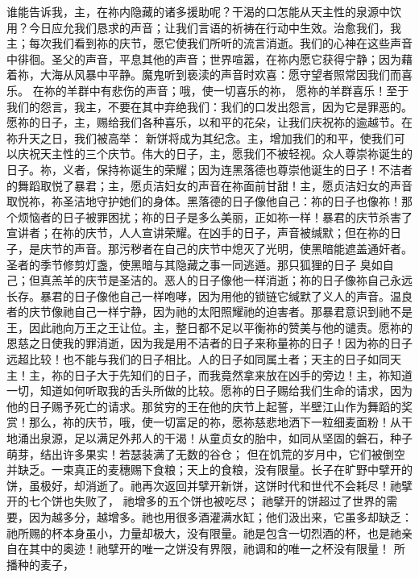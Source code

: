 谁能告诉我，主，在祢内隐藏的诸多援助呢？干渴的口怎能从天主性的泉源中饮用？\newline{}今日应允我们恳求的声音；让我们言语的祈祷在行动中生效。治愈我们，我主；每次我们看到祢的庆节，愿它使我们所听的流言消逝。我们的心神在这些声音中徘徊。圣父的声音，平息其他的声音；世界喧嚣，在祢内愿它获得宁静；因为藉着祢，大海从风暴中平静。\newline{}魔鬼听到亵渎的声音时欢喜：愿守望者照常因我们而喜乐。 在祢的羊群中有悲伤的声音；哦，使一切喜乐的祢， 愿祢的羊群喜乐！\newline{}至于我们的怨言，我主，不要在其中弃绝我们：我们的口发出怨言，因为它是罪恶的。愿祢的日子，主，赐给我们各种喜乐，以和平的花朵，让我们庆祝祢的逾越节。\newline{}在祢升天之日，我们被高举： 新饼将成为其纪念。\newline{}主，增加我们的和平，使我们可以庆祝天主性的三个庆节。\newline{}伟大的日子，主，愿我们不被轻视。众人尊崇祢诞生的日子。祢，义者，保持祢诞生的荣耀；因为连黑落德也尊崇他诞生的日子！不洁者的舞蹈取悦了暴君；主，愿贞洁妇女的声音在祢面前甘甜！主，愿贞洁妇女的声音取悦祢，祢圣洁地守护她们的身体。\newline{}黑落德的日子像他自己：祢的日子也像祢！那个烦恼者的日子被罪困扰；祢的日子是多么美丽，正如祢一样！暴君的庆节杀害了宣讲者；在祢的庆节，人人宣讲荣耀。在凶手的日子，声音被缄默；但在祢的日子，是庆节的声音。那污秽者在自己的庆节中熄灭了光明，使黑暗能遮盖通奸者。圣者的季节修剪灯盏，使黑暗与其隐藏之事一同逃遁。那只狐狸的日子 臭如自己；但真羔羊的庆节是圣洁的。\newline{}恶人的日子像他一样消逝；祢的日子像祢自己永远长存。暴君的日子像他自己一样咆哮，因为用他的锁链它缄默了义人的声音。温良者的庆节像祂自己一样宁静，因为祂的太阳照耀祂的迫害者。\newline{}那暴君意识到祂不是王，因此祂向万王之王让位。主，整日都不足以平衡祢的赞美与他的谴责。愿祢的恩慈之日使我的罪消逝，因为我是用不洁者的日子来称量祢的日子！因为祢的日子远超比较！也不能与我们的日子相比。人的日子如同属土者；天主的日子如同天主！主，祢的日子大于先知们的日子，而我竟然拿来放在凶手的旁边！主，祢知道一切，知道如何听取我的舌头所做的比较。愿祢的日子赐给我们生命的请求，因为他的日子赐予死亡的请求。那贫穷的王在他的庆节上起誓，半壁江山作为舞蹈的奖赏！那么，祢的庆节，哦，使一切富足的祢，愿祢慈悲地洒下一粒细麦面粉！\newline{}从干地涌出泉源，足以满足外邦人的干渴！从童贞女的胎中，如同从坚固的磐石，种子萌芽，结出许多果实！若瑟装满了无数的谷仓； 但在饥荒的岁月中，它们被倒空并缺乏。一束真正的麦穗赐下食粮；天上的食粮，没有限量。\newline{}长子在旷野中擘开的饼，虽极好，却消逝了。祂再次返回并擘开新饼，这饼时代和世代不会耗尽！祂擘开的七个饼也失败了， 祂增多的五个饼也被吃尽； 祂擘开的饼超过了世界的需要，因为越多分，越增多。\newline{}祂也用很多酒灌满水缸；他们汲出来，它虽多却缺乏：祂所赐的杯本身虽小，力量却极大，没有限量。祂是包含一切烈酒的杯，也是祂亲自在其中的奥迹！祂擘开的唯一之饼没有界限，祂调和的唯一之杯没有限量！ 所播种的麦子， 